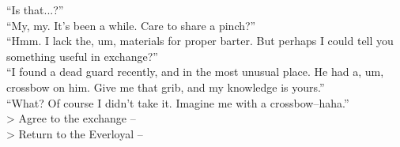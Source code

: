 “Is that...?”\\

“My, my. It’s been a while. Care to share a pinch?”\\

“Hmm. I lack the, um, materials for proper barter. But perhaps I could tell you something useful in exchange?”\\

“I found a dead guard recently, and in the most unusual place. He had a, um, crossbow on him. Give me that grib, and my knowledge is yours.”\\

“What? Of course I didn’t take it. Imagine me with a crossbow--haha.”\\

> Agree to the exchange -- \\
> Return to the Everloyal -- 